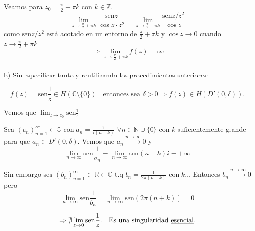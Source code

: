 {Veamos para \( z_0 = \frac{\pi}{2} + \pi k \) con \( k \in \mathbb{Z} \).
\[
\lim_{z \to \frac{\pi}{2} + \pi k} \frac{\mathrm{sen} z}{\cos z \cdot z^2} = \lim_{z \to \frac{\pi}{2} + \pi k} \frac{\mathrm{sen} z / z^2}{\cos z}
\]
como \( \mathrm{sen} z / z^2 \) está acotado en un entorno de \( \frac{\pi}{2} + \pi k \) y \( \cos z \to 0 \) cuando \( z \to \frac{\pi}{2} + \pi k \)
\[
\Rightarrow \lim_{z \to \frac{\pi}{2} + \pi k} f(z) = \infty
\]
\\
b)
Sin especificar tanto y reutilizando los procedimientos anteriores:

\[
f(z) = \mathrm{sen} \frac{1}{z} \in H(\mathbb{C} \setminus \{0\}) \quad \text{entonces sea } \delta > 0 \Rightarrow f(z) \in H(D'(0, \delta)).
\]

Vemos que \( \lim_{z \to z_0} \mathrm{sen} \frac{1}{z} \)

Sea \( (a_n)_{n=1}^\infty \subset \mathbb{C} \) con \( a_n = \frac{1}{i(n + k)} \) \( \forall n \in \mathbb{N} \cup \{0\} \) con \( k \) suficientemente grande para que \( a_n \subset D'(0, \delta) \). Vemos que \( a_n \xrightarrow{n \to \infty} 0 \)
y
\[
\lim_{n \to \infty} \mathrm{sen} \frac{1}{a_n} = \lim_{n \to \infty} \mathrm{sen}(n+k)i = +\infty
\]

Sin embargo sea \( (b_n)_{n=1}^\infty \subset \mathbb{R} \subset \mathbb{C} \) t.q \( b_n = \frac{1}{2\pi(n+k)} \) con \( k \dots \)
Entonces \( b_n \xrightarrow{n \to \infty} 0 \) pero
\[
\lim_{n \to \infty} \mathrm{sen} \frac{1}{b_n} = \lim_{n \to \infty} \mathrm{sen}(2\pi(n+k)) = 0
\]

\[
\Rightarrow \nexists \lim_{z \to 0} \mathrm{sen} \frac{1}{z}. \quad \text{Es una singularidad \underline{esencial}.}
\]
}
